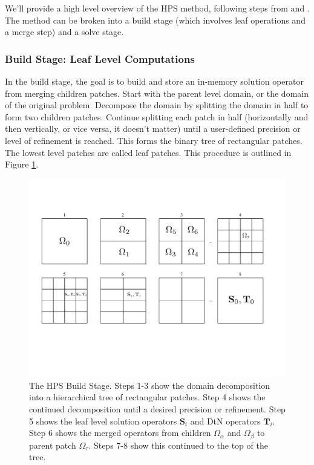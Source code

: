 We'll provide a high level overview of the HPS method, following steps from \citep{gillman2014direct} and \citep{martinsson2015hierarchical}. The method can be broken into a build stage (which involves leaf operations and a merge step) and a solve stage.

\subsubsection{Build Stage: Leaf Level Computations}

In the build stage, the goal is to build and store an in-memory solution operator from merging children patches. Start with the parent level domain, or the domain of the original problem. Decompose the domain by splitting the domain in half to form two children patches. Continue splitting each patch in half (horizontally and then vertically, or vice versa, it doesn't matter) until a user-defined precision or level of refinement is reached. This forms the binary tree of rectangular patches. The lowest level patches are called leaf patches. This procedure is outlined in Figure \ref{fig:build}.

\begin{figure}
    \centering
    \includegraphics[width=\columnwidth]{figures/build_figure.pdf}
    \caption{The HPS Build Stage. Steps 1-3 show the domain decomposition into a hierarchical tree of rectangular patches. Step 4 shows the continued decomposition until a desired precision or refinement. Step 5 shows the leaf level solution operators $\textbf{S}_{i}$ and DtN operators $\textbf{T}_{i}$. Step 6 shows the merged operators from children $\Omega_{\alpha}$ and $\Omega_{\beta}$ to parent patch $\Omega_{\tau}$. Steps 7-8 show this continued to the top of the tree.}
    \label{fig:build}
\end{figure}

